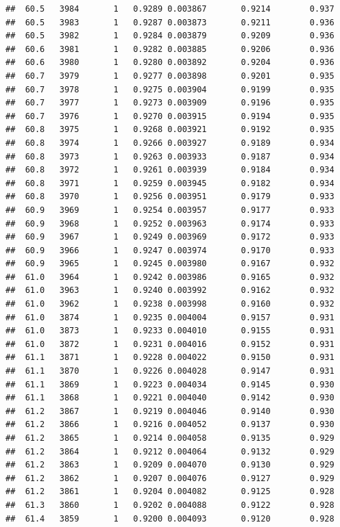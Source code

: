 \documentclass[
]{book}
\begin{document}
\begin{verbatim}
##  60.5   3984       1   0.9289 0.003867       0.9214        0.937
##  60.5   3983       1   0.9287 0.003873       0.9211        0.936
##  60.5   3982       1   0.9284 0.003879       0.9209        0.936
##  60.6   3981       1   0.9282 0.003885       0.9206        0.936
##  60.6   3980       1   0.9280 0.003892       0.9204        0.936
##  60.7   3979       1   0.9277 0.003898       0.9201        0.935
##  60.7   3978       1   0.9275 0.003904       0.9199        0.935
##  60.7   3977       1   0.9273 0.003909       0.9196        0.935
##  60.7   3976       1   0.9270 0.003915       0.9194        0.935
##  60.8   3975       1   0.9268 0.003921       0.9192        0.935
##  60.8   3974       1   0.9266 0.003927       0.9189        0.934
##  60.8   3973       1   0.9263 0.003933       0.9187        0.934
##  60.8   3972       1   0.9261 0.003939       0.9184        0.934
##  60.8   3971       1   0.9259 0.003945       0.9182        0.934
##  60.8   3970       1   0.9256 0.003951       0.9179        0.933
##  60.9   3969       1   0.9254 0.003957       0.9177        0.933
##  60.9   3968       1   0.9252 0.003963       0.9174        0.933
##  60.9   3967       1   0.9249 0.003969       0.9172        0.933
##  60.9   3966       1   0.9247 0.003974       0.9170        0.933
##  60.9   3965       1   0.9245 0.003980       0.9167        0.932
##  61.0   3964       1   0.9242 0.003986       0.9165        0.932
##  61.0   3963       1   0.9240 0.003992       0.9162        0.932
##  61.0   3962       1   0.9238 0.003998       0.9160        0.932
##  61.0   3874       1   0.9235 0.004004       0.9157        0.931
##  61.0   3873       1   0.9233 0.004010       0.9155        0.931
##  61.0   3872       1   0.9231 0.004016       0.9152        0.931
##  61.1   3871       1   0.9228 0.004022       0.9150        0.931
##  61.1   3870       1   0.9226 0.004028       0.9147        0.931
##  61.1   3869       1   0.9223 0.004034       0.9145        0.930
##  61.1   3868       1   0.9221 0.004040       0.9142        0.930
##  61.2   3867       1   0.9219 0.004046       0.9140        0.930
##  61.2   3866       1   0.9216 0.004052       0.9137        0.930
##  61.2   3865       1   0.9214 0.004058       0.9135        0.929
##  61.2   3864       1   0.9212 0.004064       0.9132        0.929
##  61.2   3863       1   0.9209 0.004070       0.9130        0.929
##  61.2   3862       1   0.9207 0.004076       0.9127        0.929
##  61.2   3861       1   0.9204 0.004082       0.9125        0.928
##  61.3   3860       1   0.9202 0.004088       0.9122        0.928
##  61.4   3859       1   0.9200 0.004093       0.9120        0.928

\end{verbatim}
\end{document}
